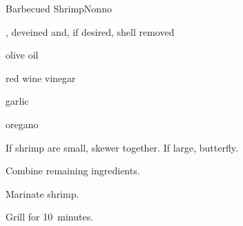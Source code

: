 \begin{recipe}{Barbecued Shrimp}{Nonno}{}

\begin{ingredients}
\item {}, deveined and, if desired, shell removed
\item olive oil
\item red wine vinegar
\item garlic
\item oregano
\end{ingredients}

\begin{directions}
\item If shrimp are small, skewer together. If large, butterfly.
\item Combine remaining ingredients.
\item Marinate shrimp.
\item Grill for 10~minutes.
\end{directions}

\end{recipe}

